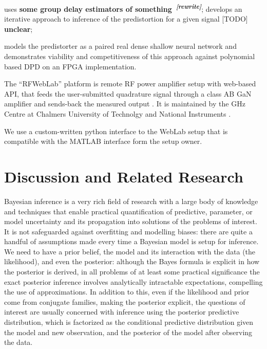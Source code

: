 \documentclass[a4paper,10pt]{article}
\newcommand{\important}[1]{\textbf{\color{red} #1}}
\newcommand{\attn}[2]{\textbf{\color{red} #2~\textsuperscript{\textit{[#1]}}}}
\newcommand{\rewrite}[1]{\attn{rewrite}{#1}}
\newcommand{\todo}[1]{{\color{blue} [TODO]} \important{#1}}
\begin{document}
\cite{traverso_low_2019} uses \rewrite{some group delay estimators of something};
\cite{schoukens_obtaining_2017} develops an iterative approach to inference of the predistortion for a given
signal \todo{unclear};

\cite{tarver_design_2019} models the predistorter as a paired real dense shallow neural network and
demonstrates viability and competitiveness of this approach against polynomial based DPD on an
FPGA implementation.

The ``RFWebLab'' platform is remote RF power amplifier setup with web-based API, that feeds
the user-submitted quadrature signal through a class AB GaN amplifier and sends-back the measured
output \cite{dpdcompetiton2018}. It is maintained by the GHz Centre at Chalmers University of
Technolgy and National Instruments \cite{landin_rfweblab_2015}.

We use a custom-written python interface to the WebLab setup that is compatible with the MATLAB
interface form the setup owner.




\section{Discussion and Related Research} %
\label{sec:discussion_and_related_research}

Bayesian inference is a very rich field of research with a large body of knowledge and techniques
that enable practical quantification of predictive, parameter, or model uncertainty and its
propagation into solutions of the problems of interest. It is not safeguarded against overfitting
and modelling biases: there are quite a handful of assumptions made every time a Bayesian model
is setup for inference. We need to have a prior belief, the model and its interaction with
the data (the likelihood), and even the posterior: although the Bayes formula is explicit in
how the posterior is derived, in all problems of at least some practical significance the
exact posterior inference involves analytically intractable expectations, compelling the use
of approximations. In addition to this, even if the likelihood and prior come from conjugate
families, making the posterior explicit, the questions of interest are usually concerned with
inference using the posterior predictive distribution, which is factorized as the conditional
predictive distribution given the model and new observation, and the posterior of the model
after observing the data.
\end{document}
